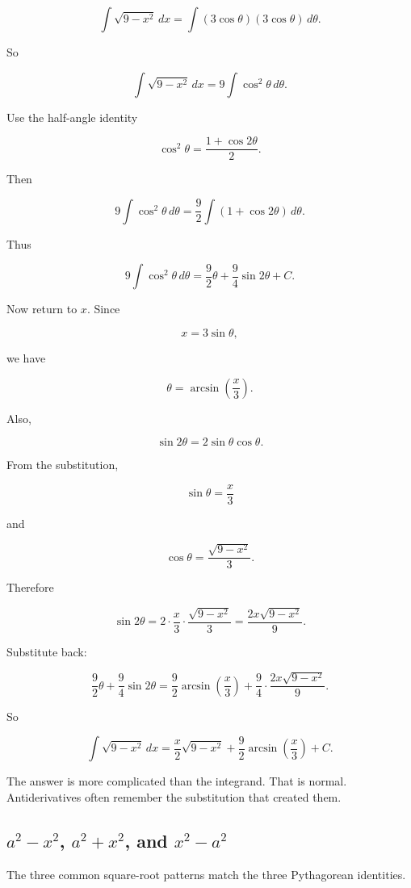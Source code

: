\[
\int \sqrt{9-x^2}\,dx
=
\int (3\cos\theta)(3\cos\theta)\,d\theta.
\]

So

\[
\int \sqrt{9-x^2}\,dx
=
9\int \cos^2\theta\,d\theta.
\]

Use the half-angle identity

\[
\cos^2\theta=\frac{1+\cos 2\theta}{2}.
\]

Then

\[
9\int \cos^2\theta\,d\theta
=
\frac92\int(1+\cos 2\theta)\,d\theta.
\]

Thus

\[
9\int \cos^2\theta\,d\theta
=
\frac92\theta+\frac94\sin2\theta+C.
\]

Now return to \(x\).  Since

\[
x=3\sin\theta,
\]

we have

\[
\theta=\arcsin\left(\frac{x}{3}\right).
\]

Also,

\[
\sin2\theta=2\sin\theta\cos\theta.
\]

From the substitution,

\[
\sin\theta=\frac{x}{3}
\]

and

\[
\cos\theta=\frac{\sqrt{9-x^2}}{3}.
\]

Therefore

\[
\sin2\theta
=
2\cdot\frac{x}{3}\cdot\frac{\sqrt{9-x^2}}{3}
=
\frac{2x\sqrt{9-x^2}}{9}.
\]

Substitute back:

\[
\frac92\theta+\frac94\sin2\theta
=
\frac92\arcsin\left(\frac{x}{3}\right)
+
\frac94\cdot\frac{2x\sqrt{9-x^2}}{9}.
\]

So

\[
\boxed{
\int \sqrt{9-x^2}\,dx
=
\frac{x}{2}\sqrt{9-x^2}
+
\frac92\arcsin\left(\frac{x}{3}\right)
+C.
}
\]

The answer is more complicated than the integrand.  That is normal.  Antiderivatives
often remember the substitution that created them.

\subsection{\texorpdfstring{\(a^2-x^2\), \(a^2+x^2\), and \(x^2-a^2\)}{a2-x2, a2+x2, and x2-a2}}
\label{subsec:three-trig-substitutions}

The three common square-root patterns match the three Pythagorean identities.

